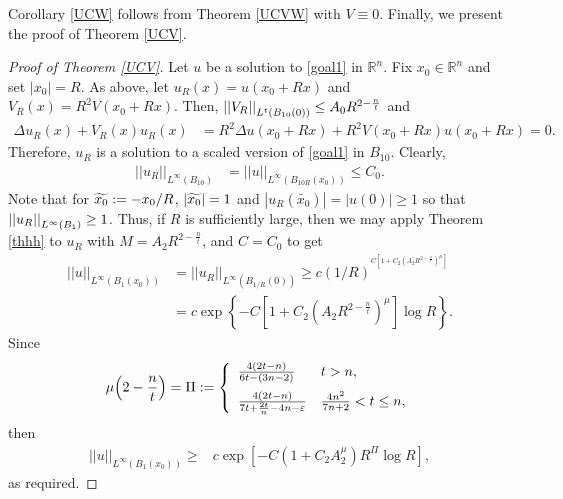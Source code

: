 \documentclass[11pt]{amsart}
\theoremstyle{plain}
\numberwithin{equation}{section}
\begin{document}
Corollary \ref{UCW} follows from Theorem \ref{UCVW} with $V \equiv 0$.
Finally, we present the proof of Theorem \ref{UCV}.

\begin{proof}[Proof of Theorem \ref{UCV}]
Let $u$ be a solution to \eqref{goal1} in ${\ensuremath{\mathbb{R}}}^n$.
Fix $x_0 \in {\ensuremath{\mathbb{R}}}^n$ and set ${\left\vert{x_0}\right\vert} = R$.
As above, let $u_R(x) = u(x_0 + Rx)$ and $V_R{\left( {x} \right) } = R^2 V{\left( {x_0 + R x} \right) }$.
Then, ${\displaystyle} {\left\vert\left\vert {V_R}\right\vert\right\vert}_{L^t{\left( {B_{10}{\left( {0} \right) }} \right) }} \le A_0 R^{2 - \frac n t}$ and
\begin{align*}
 {\Delta} u_R{\left( {x} \right) } + V_R{\left( {x} \right) } u_R{\left( {x} \right) }
&= R^2 {\Delta} u{\left( {x_0 + R x} \right) } + R^2 V{\left( {x_0 + R x} \right) }u{\left( {x_0 + R x} \right) }
= 0.
\end{align*}
Therefore, $u_R$ is a solution to a scaled version of \eqref{goal1} in $B_{10}$.
Clearly,
\begin{align*}
{\left\vert\left\vert {u_R}\right\vert\right\vert}_{L^{\infty}{\left( {B_{10}} \right) }}
&= {\left\vert\left\vert {u}\right\vert\right\vert}_{L^{\infty}{\left( {B_{10R}{\left( {x_0} \right) }} \right) }} \le C_0.
\end{align*}
Note that for ${\displaystyle}\widetilde{x_0} := -x_0/R$, ${\displaystyle}| \widetilde{x_0}| = 1$ and ${\left\vert{u_R(\widetilde{x_0})}\right\vert} = {\left\vert{u(0)}\right\vert} \ge 1$ so that ${\displaystyle}{\left\vert\left\vert {u_R}\right\vert\right\vert}_{L^{\infty}(B_1)} \ge 1$.
Thus, if $R$ is sufficiently large, then we may apply Theorem \ref{thhh} to $u_R$ with $M = A_2 R^{2 - \frac n t}$, and $\hat C = C_0$ to get
\begin{align*}
{\left\vert\left\vert {u}\right\vert\right\vert}_{L^{\infty}{\left( {{B_{1}(x_0)}} \right) }}
&= {\left\vert\left\vert {u_R}\right\vert\right\vert}_{L^{\infty}{\left( {B_{1/R}(0)} \right) }}
\ge c(1/R)^{^{C{\left[{1 + C_2 {\left( {A_2 R^{2 - \frac n t} } \right) }^\mu}\right]}}} \\
&= c \exp{\left\{{-C{\left[{1 + C_2 {\left( {A_2 R^{2 - \frac n t} } \right) }^\mu}\right]} \log R}\right\}}.
\end{align*}
Since
\begin{align*}
\mu{\left( {2 - \frac n t} \right) } = \Pi :=  \left\{\begin{array}{ll}
\frac{4{\left( {2t-n} \right) }}{6t - {\left( {3n-2} \right) }} & t > n, \medskip \\
\frac{4{\left( {2t-n} \right) }} {7t+\frac{2t}n-4n-{\varepsilon}} & \frac{4n^2}{7n+2} < t
\le n,
\end{array}\right.
\end{align*}
then
\begin{align*}
{\left\vert\left\vert {u}\right\vert\right\vert}_{L^{\infty}{\left( {{B_{1}(x_0)}} \right) }}
\ge &c \exp{\left[{-C{\left( {1 + C_2 A_2^\mu } \right) } R^\Pi \log R}\right]},
\end{align*}
as required.
\end{proof}
\end{document}
